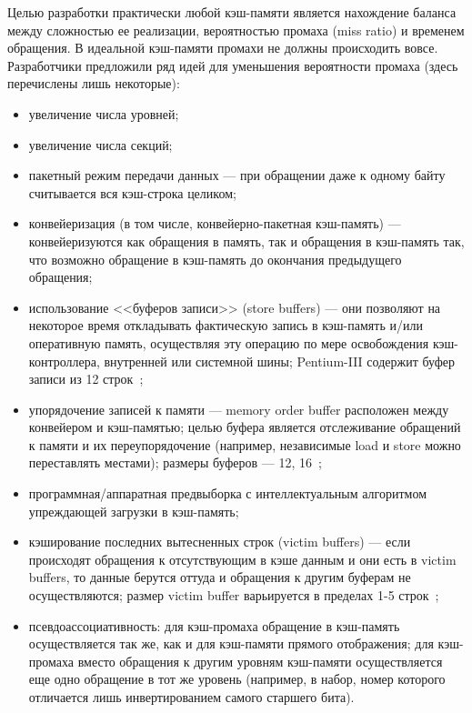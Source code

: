 Целью разработки практически любой кэш-памяти является нахождение баланса между сложностью ее реализации, вероятностью промаха (miss ratio) и временем обращения. В идеальной кэш-памяти промахи не должны происходить вовсе. Разработчики предложили ряд идей для уменьшения вероятности промаха (здесь перечислены лишь некоторые):
\begin{itemize}
	\item увеличение числа уровней;
	\item увеличение числа секций;
	\item пакетный режим передачи данных --- при обращении даже к одному байту считывается вся кэш-строка целиком;
	\item конвейеризация (в том числе, конвейерно-пакетная кэш-память) --- конвейеризуются как обращения в память, так и обращения в кэш-память так, что возможно обращение в кэш-память до окончания предыдущего обращения;
	\item использование <<буферов записи>> (store buffers) --- они позволяют на некоторое время откладывать фактическую запись в кэш-память и/или оперативную память, осуществляя эту операцию по мере освобождения кэш-контроллера, внутренней или системной шины; Pentium-III содержит буфер записи из 12 строк~\cite{Kasperski_EffectiveMemory};


	\item упорядочение записей к памяти --- memory order buffer расположен между конвейером и кэш-памятью; целью буфера является отслеживание обращений к памяти и их переупорядочение (например, независимые load и store можно переставлять местами); размеры буферов --- 12, 16~\cite{MOBs};
	\item программная/аппаратная предвыборка с интеллектуальным алгоритмом упреждающей загрузки в кэш-память;
	\item кэширование последних вытесненных строк (victim buffers) --- если происходят обращения к отсутствующим в кэше данным и они есть в victim buffers, то данные берутся оттуда и обращения к другим буферам не осуществляются; размер victim buffer варьируется в пределах 1-5 строк~\cite{HennesyPatterson};
	\item псевдоассоциативность\cite{HennesyPatterson}: для кэш-промаха обращение в кэш-память осуществляется так же, как и для кэш-памяти прямого отображения; для кэш-промаха вместо обращения к другим уровням кэш-памяти осуществляется еще одно обращение в тот же уровень (например, в набор, номер которого отличается лишь инвертированием самого старшего бита).
\end{itemize}

